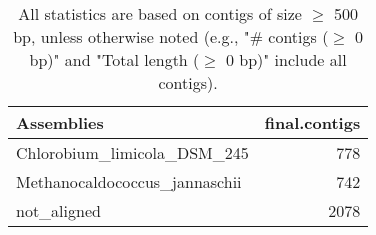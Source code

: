 \documentclass[12pt,a4paper]{article}
\begin{document}
\begin{table}[ht]
\begin{center}
\caption{All statistics are based on contigs of size $\geq$ 500 bp, unless otherwise noted (e.g., "\# contigs ($\geq$ 0 bp)" and "Total length ($\geq$ 0 bp)" include all contigs).}
\begin{tabular}{|l*{1}{|r}|}
\hline
Assemblies & final.contigs \\ \hline
Chlorobium\_limicola\_DSM\_245 & 778 \\ \hline
Methanocaldococcus\_jannaschii & 742 \\ \hline
not\_aligned & 2078 \\ \hline
\end{tabular}
\end{center}
\end{table}
\end{document}
